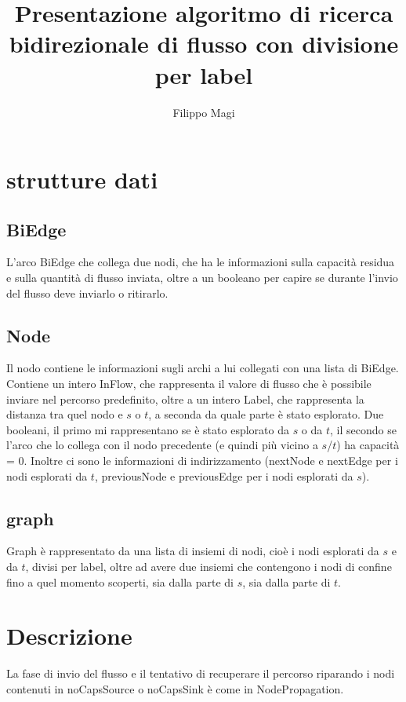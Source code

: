 \documentclass{article}
\title{Presentazione algoritmo di ricerca bidirezionale di flusso con divisione per label}
\author{Filippo Magi }
\begin{document}
\maketitle

\section{strutture dati}
\subsection{BiEdge}

L'arco BiEdge che collega due nodi, che ha le informazioni sulla capacità residua e sulla quantità di flusso inviata, oltre a un booleano per capire se durante l'invio del flusso deve inviarlo o ritirarlo.

\subsection{Node}

Il nodo contiene le informazioni sugli archi a lui collegati con una lista di BiEdge.
Contiene un intero InFlow, che rappresenta il valore di flusso che è possibile inviare nel percorso predefinito, oltre a un intero Label, che rappresenta la distanza tra quel nodo e $s$ o $t$, a seconda da quale parte è stato esplorato.
Due booleani, il primo mi rappresentano se è stato esplorato da $s$ o da $t$, il secondo se l'arco che lo collega con il nodo precedente (e quindi più vicino a $s$/$t$) ha capacità =  0.
Inoltre ci sono le informazioni di indirizzamento (nextNode e nextEdge per i nodi esplorati da $t$, previousNode e previousEdge per i nodi esplorati da $s$).
\subsection{graph}
Graph è rappresentato da una lista di insiemi di nodi, cioè i nodi esplorati da $s$ e da $t$, divisi per label, oltre ad avere due insiemi che contengono i nodi di confine fino a quel momento scoperti, sia dalla parte di $s$, sia dalla parte di $t$.

\section{Descrizione}

La fase di invio del flusso e il tentativo di recuperare il percorso riparando i nodi contenuti in noCapsSource o noCapsSink è come in NodePropagation. %
\end{document}
